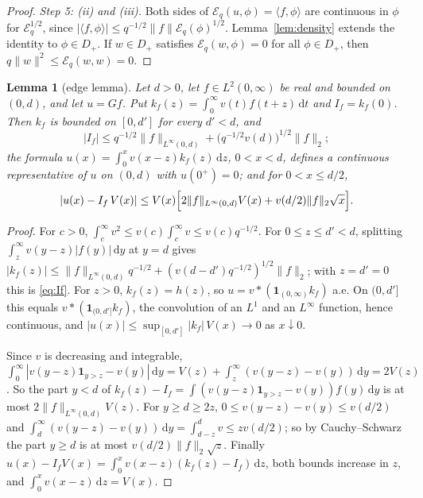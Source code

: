 \documentclass[11pt]{amsart}
\newcommand{\E}{\mathcal{E}}
\newcommand{\one}{\mathbf{1}}
\newcommand{\dd}{\,\mathrm{d}}
\newtheorem{lemma}[theorem]{Lemma}
\theoremstyle{definition}
\theoremstyle{remark}
\numberwithin{equation}{section}
\begin{document}
\begin{proof}
\emph{Step 5: (ii) and (iii).} Both sides of $\E_q(u,\phi)=\langle f,\phi\rangle$ are continuous in $\phi$ for $\E_q^{1/2}$, since $|\langle f,\phi\rangle|\le q^{-1/2}\|f\|\E_q(\phi)^{1/2}$. Lemma~\ref{lem:density} extends the identity to $\phi\in D_+$. If $w\in D_+$ satisfies $\E_q(w,\phi)=0$ for all $\phi\in D_+$, then $q\|w\|^2\le\E_q(w,w)=0$.
\end{proof}

\begin{lemma}[edge lemma]\label{lem:edge}
Let $d>0$, let $f\in L^2(0,\infty)$ be real and bounded on $(0,d)$, and let $u=Gf$. Put $k_f(z)=\int_0^\infty v(t)f(t+z)\dd t$ and $I_f=k_f(0)$. Then $k_f$ is bounded on $[0,d']$ for every $d'<d$, and
\begin{equation}\label{eq:If}
|I_f|\le q^{-1/2}\|f\|_{L^\infty(0,d)}+\bigl(q^{-1/2}v(d)\bigr)^{1/2}\|f\|_2 ;
\end{equation}
the formula $u(x)=\int_0^xv(x-z)k_f(z)\dd z$, $0<x<d$, defines a continuous representative of $u$ on $(0,d)$ with $u(0^+)=0$; and for $0<x\le d/2$,
\begin{equation}\label{eq:edgelemma}
|u(x)-I_f\,V(x)|\le V(x)\Bigl[2\|f\|_{L^\infty(0,d)}V(x)+v(d/2)\|f\|_2\sqrt x\Bigr].
\end{equation}
\end{lemma}

\begin{proof}
For $c>0$, $\int_c^\infty v^2\le v(c)\int_c^\infty v\le v(c)q^{-1/2}$. For $0\le z\le d'<d$, splitting $\int_z^\infty v(y-z)|f(y)|\dd y$ at $y=d$ gives $|k_f(z)|\le\|f\|_{L^\infty(0,d)}q^{-1/2}+(v(d-d')q^{-1/2})^{1/2}\|f\|_2$; with $z=d'=0$ this is \eqref{eq:If}. For $z>0$, $k_f(z)=h(z)$, so $u=v*(\one_{(0,\infty)}k_f)$ a.e. On $(0,d']$ this equals $v*(\one_{(0,d']}k_f)$, the convolution of an $L^1$ and an $L^\infty$ function, hence continuous, and $|u(x)|\le\sup_{[0,d']}|k_f|\,V(x)\to0$ as $x\downarrow0$.

Since $v$ is decreasing and integrable, $\int_0^\infty|v(y-z)\one_{y>z}-v(y)|\dd y=V(z)+\int_z^\infty(v(y-z)-v(y))\dd y=2V(z)$. So the part $y<d$ of $k_f(z)-I_f=\int(v(y-z)\one_{y>z}-v(y))f(y)\dd y$ is at most $2\|f\|_{L^\infty(0,d)}V(z)$. For $y\ge d\ge2z$, $0\le v(y-z)-v(y)\le v(d/2)$ and $\int_d^\infty(v(y-z)-v(y))\dd y=\int_{d-z}^dv\le zv(d/2)$; so by Cauchy--Schwarz the part $y\ge d$ is at most $v(d/2)\|f\|_2\sqrt z$. Finally $u(x)-I_fV(x)=\int_0^xv(x-z)(k_f(z)-I_f)\dd z$, both bounds increase in $z$, and $\int_0^xv(x-z)\dd z=V(x)$.
\end{proof}
\end{document}
